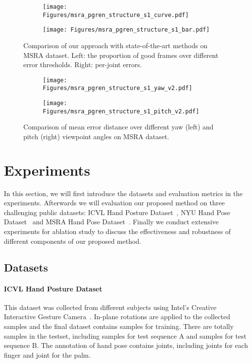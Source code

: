 \documentclass[final, 5p]{elsarticle}
\begin{document}
\begin{figure*}[!tb]
  \centering
  \begin{subfigure}[t]{0.5\textwidth}
    \centering
    \centerline{\texttt{[image: Figures/msra\_pgren\_structure\_s1\_curve.pdf]}}
  \end{subfigure}\begin{subfigure}[t]{0.5\textwidth}
    \centering
    \centerline{\texttt{[image: Figures/msra\_pgren\_structure\_s1\_bar.pdf]}}
  \end{subfigure}\caption{Comparison of our approach with state-of-the-art methods on MSRA dataset. Left: the proportion of good frames
over different error thresholds. Right: per-joint errors.}
\label{fig:msra-results}
\end{figure*}


\begin{figure*}[!tb]
  \centering
  \begin{subfigure}[t]{0.5\textwidth}
    \centering
    \centerline{\texttt{[image: Figures/msra\_pgren\_structure\_s1\_yaw\_v2.pdf]}}
  \end{subfigure}\begin{subfigure}[t]{0.5\textwidth}
    \centering
    \centerline{\texttt{[image: Figures/msra\_pgren\_structure\_s1\_pitch\_v2.pdf]}}
  \end{subfigure}\caption{Comparison of mean error distance over different yaw (left) and pitch (right) viewpoint angles on MSRA dataset.}
\label{fig:msra-results-angle}
\end{figure*}

\section{Experiments}
\label{sec:exp}
In this section, we will first introduce the datasets and evaluation metrics in the experiments. Afterwards we will evaluation our proposed method on three challenging public datasets: ICVL Hand Posture Dataset~\cite{tang2014latent}, NYU Hand Pose Dataset~\cite{tompson2014real} and MSRA Hand Pose Dataset~\cite{sun2015cascaded}. Finally we conduct extensive experiments for ablation study to discuss the effectiveness and robustness of different components of our proposed method.

\subsection{Datasets}
\paragraph{\textbf{ICVL Hand Posture Dataset}~\cite{tang2014latent}} This dataset was collected from  different subjects using Intel's Creative Interactive Gesture Camera~\cite{melax2013dynamics}. In-plane rotations are applied to the collected samples and the final dataset contains  samples for training. There are totally  samples in the testset, including  samples for test sequence A and  samples for test sequence B. The annotation of hand pose contains  joints, including  joints for each finger and  joint for the palm.
\end{document}

